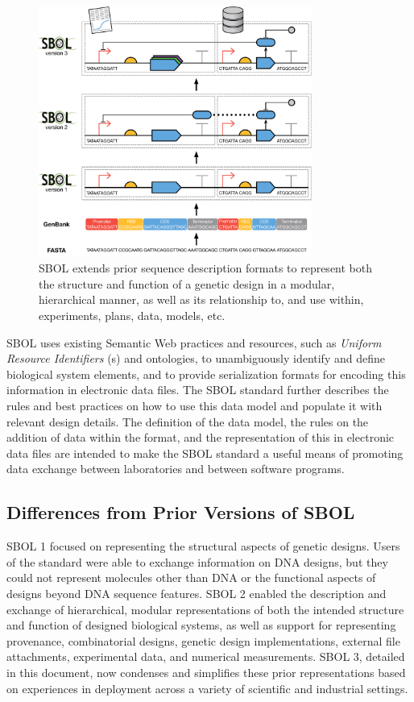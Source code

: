 \begin{figure}[htbp!]
\centering
\includegraphics[width=0.8\textwidth]{images/SBOL3-evolution.pdf}
\caption{SBOL extends prior sequence description formats to represent both the structure and function of a genetic design in a modular, hierarchical manner, as well as its relationship to, and use within, experiments, plans, data, models, etc.}
\label{f:sequence}
\end{figure}

SBOL uses existing Semantic Web practices and resources, such as \emph{Uniform Resource Identifiers} (s) and ontologies, to unambiguously identify and define biological system elements,
and to provide serialization formats for encoding this information in electronic data files.
The SBOL standard further describes the rules and best practices on how to use this data model and populate it with relevant design details. 
The definition of the data model, the rules on the addition of data within the format, and the representation of this in electronic data files are intended to make the SBOL standard a useful means of promoting data exchange between laboratories and between software programs.

\subsection{Differences from Prior Versions of SBOL}
SBOL 1 focused on representing the structural aspects of genetic designs. Users of the standard were able to exchange information on DNA designs, but they could not represent molecules other than DNA or the functional aspects of designs beyond DNA sequence features. SBOL 2 enabled the description and exchange of hierarchical, modular representations of both the intended structure and function of designed biological systems, as well as support for representing provenance, combinatorial designs, genetic design implementations, external file attachments, experimental data, and numerical measurements. 
SBOL 3, detailed in this document, now condenses and simplifies these prior representations based on experiences in deployment across a variety of scientific and industrial settings.

